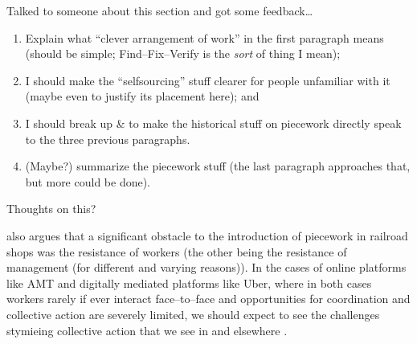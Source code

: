 \documentclass[trackingWork]{subfiles}
\begin{document}
{\begin{appendices}
      Talked to someone about this section and got some feedback\dots
      \begin{enumerate}
        \item Explain what ``clever arrangement of work'' in the first paragraph means
              (should be simple; Find--Fix--Verify is the \textit{sort} of thing I mean);
        \item I should make the ``selfsourcing'' stuff clearer for people unfamiliar with it
              (maybe even to justify its placement here); and
        \item I should break up \citeauthor{10.2307/23702539} \& \citeauthor{Brown01041990}
              to make the historical stuff on piecework
              directly speak to the three previous paragraphs.
        \item (Maybe?) summarize the piecework stuff
              (the last paragraph approaches that, but more could be done).
      \end{enumerate}
      Thoughts on this?

  \citeauthor{10.2307/23702539} also argues that
  a significant obstacle to the introduction of piecework in railroad shops was
  the resistance of workers
  (the other being the resistance of management (for different and varying reasons)).
  In the cases of online platforms like AMT and digitally mediated platforms like Uber,
  where in both cases workers rarely
  if ever
  interact face--to--face and
  opportunities for coordination and collective action are severely limited,
  we should expect to see
  the challenges stymieing collective action
  that we see in \citeauthor{dynamo} and elsewhere
  \cite{10.2307/23702539,dynamo}.
  \end{appendices}


}
\end{document}
